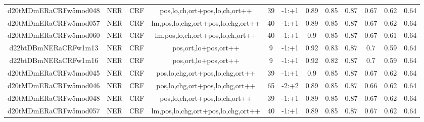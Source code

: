 \documentclass[a4paper]{article}
\begin{document}
\begin{landscape}
\begin{center}
\begin{tabular}{ |c|c|c|c|c|c|c|c|c|c|c|c|}
 
 	
 	\small{ d20tMDmERaCRFw5mod048 } & \small{ NER} & \small{  CRF }  & pos,lo,ch,ort+pos,lo,ch,ort++  &  39 &  \small{  -1:+1 }  &  0.89 & 0.85 & 0.87  &  0.67 & 0.62 & 0.64 \\
 	

 
 	
 	\small{ d20tMDmERaCRFw5mod057 } & \small{ NER} & \small{  CRF }  & lm,pos,lo,chg,ort+pos,lo,chg,ort++  &  40 &  \small{  -1:+1 }  &  0.89 & 0.85 & 0.87  &  0.67 & 0.62 & 0.64 \\
 	

 
 	
 	\small{ d20tMDmERaCRFw5mod060 } & \small{ NER} & \small{  CRF }  & lm,pos,lo,ch,ort+pos,lo,ch,ort++  &  40 &  \small{  -1:+1 }  &  0.9 & 0.85 & 0.87  &  0.67 & 0.61 & 0.64 \\
 	

 
 	
 	\small{ d22btDBmNERaCRFw1m13 } & \small{ NER} & \small{  CRF }  & pos,ort,lo+pos,ort++  &  9 &  \small{  -1:+1 }  &  0.92 & 0.83 & 0.87  &  0.7 & 0.59 & 0.64 \\
 	

 
 	
 	\small{ d22btDBmNERaCRFw1m16 } & \small{ NER} & \small{  CRF }  & pos,ort,lo+pos,ort++  &  9 &  \small{  -1:+1 }  &  0.92 & 0.82 & 0.87  &  0.7 & 0.59 & 0.64 \\
 	

 
 	
 	\small{ d20tMDmERaCRFw5mod045 } & \small{ NER} & \small{  CRF }  & pos,lo,chg,ort+pos,lo,chg,ort++  &  39 &  \small{  -1:+1 }  &  0.9 & 0.85 & 0.87  &  0.67 & 0.62 & 0.64 \\
 	

 
 	
 	\small{ d20tMDmERaCRFw5mod046 } & \small{ NER} & \small{  CRF }  & pos,lo,chg,ort+pos,lo,chg,ort++  &  65 &  \small{  -2:+2 }  &  0.89 & 0.85 & 0.87  &  0.66 & 0.62 & 0.64 \\
 	

 
 	
 	\small{ d20tMDmERaCRFw5mod048 } & \small{ NER} & \small{  CRF }  & pos,lo,ch,ort+pos,lo,ch,ort++  &  39 &  \small{  -1:+1 }  &  0.89 & 0.85 & 0.87  &  0.67 & 0.62 & 0.64 \\
 	

 
 	
 	\small{ d20tMDmERaCRFw5mod057 } & \small{ NER} & \small{  CRF }  & lm,pos,lo,chg,ort+pos,lo,chg,ort++  &  40 &  \small{  -1:+1 }  &  0.89 & 0.85 & 0.87  &  0.67 & 0.62 & 0.64 \\
 	


\end{tabular}
\end{center}
\end{landscape}
\end{document}

